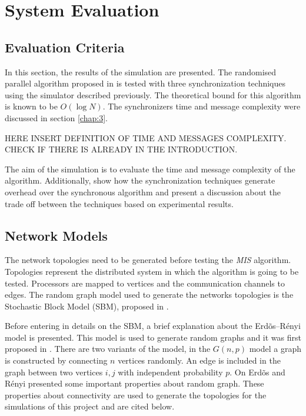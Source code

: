 \section{System Evaluation}

\subsection{Evaluation Criteria}

In this section, the results of the simulation are presented. The randomised parallel algorithm proposed in \cite{yves2009optimal} is tested with three synchronization techniques using the simulator described previously. The theoretical bound for this algorithm is known to be $O(\log N)$. The synchronizers time and message complexity were discussed in section \ref{chap:3}. 

HERE INSERT DEFINITION OF TIME AND MESSAGES COMPLEXITY. CHECK IF THERE IS ALREADY IN THE INTRODUCTION.

 The aim of the simulation is to evaluate the time and message complexity of the algorithm. Additionally, show how the synchronization techniques generate overhead over the synchronous algorithm and present a discussion about the trade off between the techniques based on experimental results.


\subsection{Network Models}
\label{sec:topology}


The network topologies need to be generated before testing the \textit{MIS} algorithm. Topologies represent the distributed system in which the algorithm is going to be tested. Processors are mapped to vertices and the communication channels to edges.  The random graph model used to generate the networks topologies is the Stochastic Block Model (SBM), proposed in \cite{holland1983stochastic}.

Before entering in details on the SBM, a brief explanation about the Erd\~os--R\'enyi model is presented. This model is used to generate random graphs and it was first proposed in \cite{erdds1959random}. There are two variants of the model, in the $G(n, p)$ model a graph is constructed by connecting $n$ vertices randomly. An edge is included in the graph between two vertices $i,j$ with independent probability $p$. On \cite{erdos1960evolution} Erd\~os and R\'enyi presented some important properties about random graph. These properties about connectivity are used to generate the topologies for the simulations of this project and are cited below.


